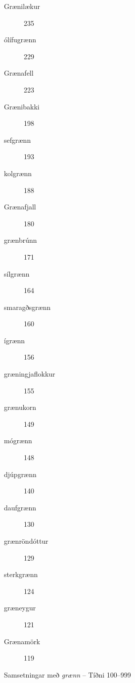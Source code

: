 \documentclass[../samsetningasafn.tex]{subfiles}
\begin{document}
\begin{bigwordlist}
\begin{footnotesize}
\begin{multicols}{4}
\begin{description}
		\item [Grænilækur]		235	
		\item [ólífugrænn]		229	
		\item [Grænafell]		223	
		\item [Grænibakki]		198	
		\item [sefgrænn]		193	
		\item [kolgrænn]		188	
		\item [Grænafjall]		180	
		\item [grænbrúnn]		171	
		\item [sílgrænn]	164	
		\item [smaragðsgrænn]		160
		\item [ígrænn]	156
		\item [græningjaflokkur]		155
		\item [grænukorn]	149
		\item [mógrænn]		148
		\item [djúpgrænn]		140
		\item [daufgrænn]		130
		\item [grænröndóttur]		129
		\item [sterkgrænn]		124
		\item [græneygur]		121
		\item [Grænamörk]		119
	\end{description}
\end{multicols}
\end{footnotesize}
	
\label{listi:graen999}
\caption{Samsetningar með \textit{grænn} -- Tíðni 100--999}
\end{bigwordlist}		
\end{document}
